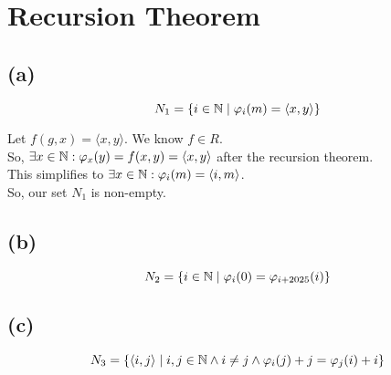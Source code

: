 



\section{Recursion Theorem}

\subsection{(a)}
$$N_{1} = \left\{ i \in \mathbb{N} \mid \varphi_{i}(m) = \langle x,y \rangle \right\}$$

Let $f(g,x) = \langle x,y \rangle$. We know $f \in R$.\\
So, $\exists x \in \mathbb{N} : \varphi_{x}(y) = f(x,y) = \langle x,y \rangle$ after the recursion theorem.\\
This simplifies to $\exists x \in \mathbb{N}: \varphi_{i}(m) = \langle i,m\rangle$.\\
So, our set $N_{1}$ is non-empty.

\subsection{(b)}
$$N_{2} = \left\{ i \in \mathbb{N} \mid \varphi_{i}(0) = \varphi_{i+2025}(i) \right\}$$

\subsection{(c)}
$$N_{3} = \left\{ \langle i,j \rangle \mid i,j \in \mathbb{N} \wedge i \neq j \wedge \varphi_{i}(j) + j = \varphi_{j}(i) + i \right\}$$


